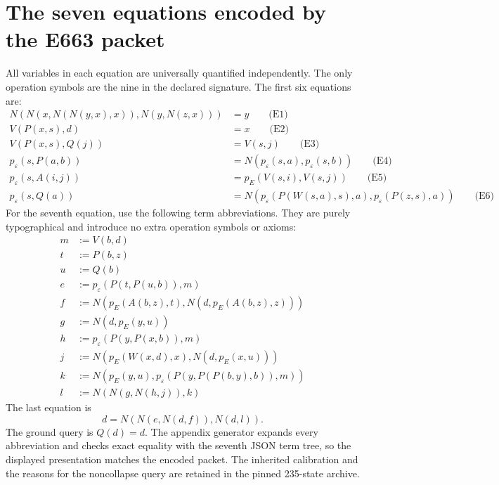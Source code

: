 \section{The seven equations encoded by the E663 packet}
All variables in each equation are universally quantified independently.
The only operation symbols are the nine in the declared signature.
The first six equations are:
\begin{align*}
N(N(x,N(N(y,x),x)),N(y,N(z,x))) &= y\qquad\text{(E1)}\\
V(P(x,s),d) &= x\qquad\text{(E2)}\\
V(P(x,s),Q(j)) &= V(s,j)\qquad\text{(E3)}\\
p_\varepsilon(s,P(a,b)) &= N(p_\varepsilon(s,a),p_\varepsilon(s,b))\qquad\text{(E4)}\\
p_\varepsilon(s,A(i,j)) &= p_E(V(s,i),V(s,j))\qquad\text{(E5)}\\
p_\varepsilon(s,Q(a)) &= N(p_\varepsilon(P(W(s,a),s),a),p_\varepsilon(P(z,s),a))\qquad\text{(E6)}
\end{align*}
For the seventh equation, use the following term abbreviations.
They are purely typographical and introduce no extra operation
symbols or axioms:
\begin{align*}
m &:= V(b,d)\\
t &:= P(b,z)\\
u &:= Q(b)\\
e &:= p_\varepsilon(P(t,P(u,b)),m)\\
f &:= N(p_E(A(b,z),t),N(d,p_E(A(b,z),z)))\\
g &:= N(d,p_E(y,u))\\
h &:= p_\varepsilon(P(y,P(x,b)),m)\\
j &:= N(p_E(W(x,d),x),N(d,p_E(x,u)))\\
k &:= N(p_E(y,u),p_\varepsilon(P(y,P(P(b,y),b)),m))\\
l &:= N(N(g,N(h,j)),k)
\end{align*}
The last equation is
\[d=N(N(e,N(d,f)),N(d,l)).\tag{E7}\]
The ground query is $Q(d)=d$. The appendix generator expands every
abbreviation and checks exact equality with the seventh JSON term
tree, so the displayed presentation matches the encoded packet.
The inherited calibration and the reasons for the noncollapse query
are retained in the pinned 235-state archive.
